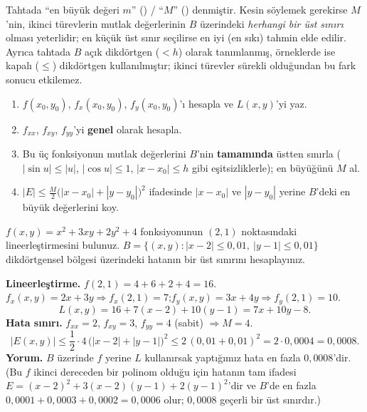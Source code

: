 \begin{bilgi}
Tahtada ``en büyük değeri $m$'' () / ``$M$'' () denmiştir. Kesin
söylemek gerekirse $M$'nin, ikinci türevlerin mutlak değerlerinin $B$ üzerindeki \emph{herhangi bir üst sınırı} olması
yeterlidir; en küçük üst sınır seçilirse en iyi (en sıkı) tahmin elde edilir. Ayrıca tahtada $B$ açık dikdörtgen
($<h$) olarak tanımlanmış, örneklerde ise kapalı ($\le$) dikdörtgen kullanılmıştır; ikinci türevler sürekli olduğundan
bu fark sonucu etkilemez.
\end{bilgi}

\begin{teorem}
\begin{enumerate}
  \item $f(x_0,y_0)$, $f_x(x_0,y_0)$, $f_y(x_0,y_0)$'ı hesapla ve $L(x,y)$'yi yaz.
  \item $f_{xx}$, $f_{xy}$, $f_{yy}$'yi \textbf{genel} olarak hesapla.
  \item Bu üç fonksiyonun mutlak değerlerini $B$'nin \textbf{tamamında} üstten sınırla ($|\sin u|\le|u|$, $|\cos u|\le1$,
        $|x-x_0|\le h$ gibi eşitsizliklerle); en büyüğünü $M$ al.
  \item $|E|\le\frac M2\big(|x-x_0|+|y-y_0|\big)^2$ ifadesinde $|x-x_0|$ ve $|y-y_0|$ yerine $B$'deki en büyük değerlerini koy.
\end{enumerate}
\end{teorem}

\begin{soru}
$f(x,y)=x^2+3xy+2y^2+4$ fonksiyonunun $(2,1)$ noktasındaki lineerleştirmesini bulunuz.
$B=\{(x,y):|x-2|\le0{,}01,\ |y-1|\le0{,}01\}$ dikdörtgensel bölgesi üzerindeki hatanın bir üst sınırını hesaplayınız.
\end{soru}
\begin{cevap}
\textbf{Lineerleştirme.} $f(2,1)=4+6+2+4=16$.\\
$f_x(x,y)=2x+3y\Rightarrow f_x(2,1)=7$;\quad $f_y(x,y)=3x+4y\Rightarrow f_y(2,1)=10$.
\[ L(x,y)=16+7(x-2)+10(y-1)=7x+10y-8 . \]
\textbf{Hata sınırı.} $f_{xx}=2$, $f_{xy}=3$, $f_{yy}=4$ (sabit) $\Rightarrow M=4$.
\[
|E(x,y)|\le\frac12\cdot4\,\big(|x-2|+|y-1|\big)^2\le2\,(0{,}01+0{,}01)^2=2\cdot0{,}0004=0{,}0008 .
\]
\textbf{Yorum.} $B$ üzerinde $f$ yerine $L$ kullanırsak yaptığımız hata en fazla $0{,}0008$'dir. (Bu $f$ ikinci dereceden
bir polinom olduğu için hatanın tam ifadesi $E=(x-2)^2+3(x-2)(y-1)+2(y-1)^2$'dir ve $B$'de en fazla
$0{,}0001+0{,}0003+0{,}0002=0{,}0006$ olur; $0{,}0008$ geçerli bir üst sınırdır.)
\end{cevap}

